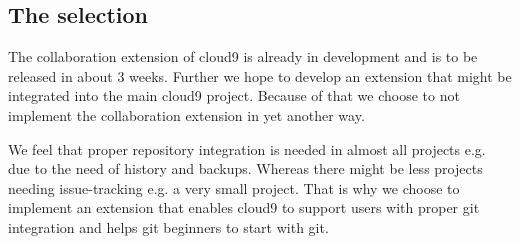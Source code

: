 \subsection{The selection}

The collaboration extension of cloud9 is already in development and is to be released in about 3 weeks.
Further we hope to develop an extension that might be integrated into the main cloud9 project.
Because of that we choose to not implement the collaboration extension in yet another way.

We feel that proper repository integration is needed in almost all projects e.g. due to the need of history and backups.
Whereas there might be less projects needing issue-tracking e.g. a very small project.
That is why we choose to implement an extension that enables cloud9 to support users with proper git integration and helps git beginners to start with git.





